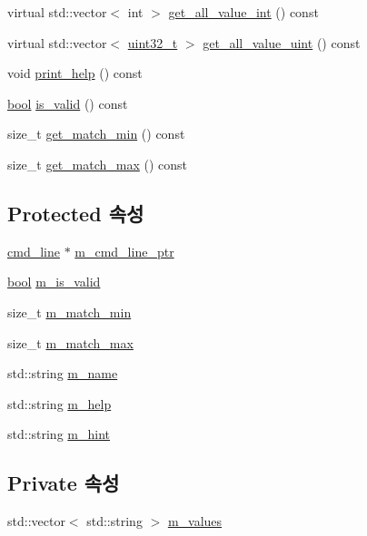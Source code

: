 \begin{DoxyCompactItemize}
\item 
virtual std\+::vector$<$ int $>$ \hyperlink{classcli__argument_a714bede99fe9cb950c3c93e81cb96074}{get\+\_\+all\+\_\+value\+\_\+int} () const 
\item 
virtual std\+::vector$<$ \hyperlink{parse_8c_a6eb1e68cc391dd753bc8ce896dbb8315}{uint32\+\_\+t} $>$ \hyperlink{classcli__argument_a2636ddb80a5e6d770a9928181926cfe2}{get\+\_\+all\+\_\+value\+\_\+uint} () const 
\item 
void \hyperlink{classcli__argument_a695407d45700941d937b4c11c6b140d1}{print\+\_\+help} () const 
\item 
\hyperlink{avb__gptp_8h_af6a258d8f3ee5206d682d799316314b1}{bool} \hyperlink{classcli__argument_a73e929d29381f1d792af13350b79222c}{is\+\_\+valid} () const 
\item 
size\+\_\+t \hyperlink{classcli__argument_a513ea3e90c4e9f5f32dbb57b4e989280}{get\+\_\+match\+\_\+min} () const 
\item 
size\+\_\+t \hyperlink{classcli__argument_abc7abd92891ff2380bbaf15b99eb6394}{get\+\_\+match\+\_\+max} () const 
\end{DoxyCompactItemize}
\subsection*{Protected 속성}
\begin{DoxyCompactItemize}
\item 
\hyperlink{classcmd__line}{cmd\+\_\+line} $\ast$ \hyperlink{classcli__argument_a802ef904236d4228f1b8edb3a96eb9cd}{m\+\_\+cmd\+\_\+line\+\_\+ptr}
\item 
\hyperlink{avb__gptp_8h_af6a258d8f3ee5206d682d799316314b1}{bool} \hyperlink{classcli__argument_a3163252d457c8ef3a286a8538d7e319f}{m\+\_\+is\+\_\+valid}
\item 
size\+\_\+t \hyperlink{classcli__argument_a9e9208481670105577821d0a1aee5179}{m\+\_\+match\+\_\+min}
\item 
size\+\_\+t \hyperlink{classcli__argument_a6f9fd009acee86b73a9f1b8e80a95b43}{m\+\_\+match\+\_\+max}
\item 
std\+::string \hyperlink{classcli__argument_adb41893ba19e889e56c559f25fc1a68a}{m\+\_\+name}
\item 
std\+::string \hyperlink{classcli__argument_a3985971d45415a337f60ed183b445c96}{m\+\_\+help}
\item 
std\+::string \hyperlink{classcli__argument_a3feeeba99be6bb94b8fa0ebc88ef09cf}{m\+\_\+hint}
\end{DoxyCompactItemize}
\subsection*{Private 속성}
\begin{DoxyCompactItemize}
\item 
std\+::vector$<$ std\+::string $>$ \hyperlink{classcli__argument__string_a698dcbe3063b2cb63a77b9973fb18dcf}{m\+\_\+values}
\end{DoxyCompactItemize}


